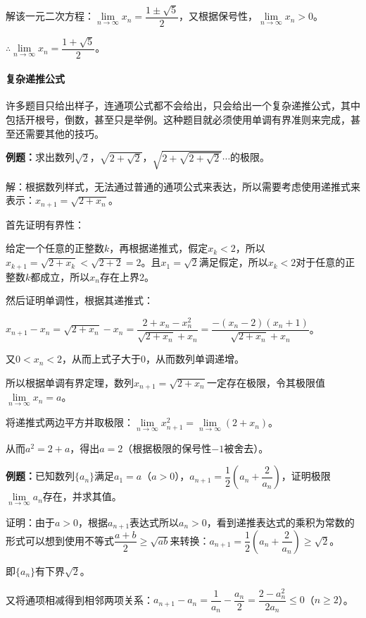 \documentclass[UTF8, 12pt]{ctexart}
\begin{document}
解该一元二次方程：$\lim\limits_{n\to\infty}x_n=\dfrac{1\pm\sqrt{5}}{2}$，又根据保号性，$\lim\limits_{n\to\infty}x_n>0$。

$\therefore\lim\limits_{n\to\infty}x_n=\dfrac{1+\sqrt{5}}{2}$。

\paragraph{复杂递推公式} \leavevmode \medskip

许多题目只给出样子，连通项公式都不会给出，只会给出一个复杂递推公式，其中包括开根号，倒数，甚至只是举例。这种题目就必须使用单调有界准则来完成，甚至还需要其他的技巧。\medskip

\textbf{例题：}求出数列$\sqrt{2}$，$\sqrt{2+\sqrt{2}}$，$\sqrt{2+\sqrt{2+\sqrt{2}}}$$\cdots$的极限。

解：根据数列样式，无法通过普通的通项公式来表达，所以需要考虑使用递推式来表示：$x_{n+1}=\sqrt{2+x_n}$。

首先证明有界性：

给定一个任意的正整数$k$，再根据递推式，假定$x_k<2$，所以$x_{k+1}=\sqrt{2+x_k}<\sqrt{2+2}=2$。且$x_1=\sqrt{2}$满足假定，所以$x_k<2$对于任意的正整数$k$都成立，所以$x_n$存在上界2。

然后证明单调性，根据其递推式：

$x_{n+1}-x_n=\sqrt{2+x_n}-x_n=\dfrac{2+x_n-x_n^2}{\sqrt{2+x_n}+x_n}=\dfrac{-(x_n-2)(x_n+1)}{\sqrt{2+x_n}+x_n}$。\medskip

又$0<x_n<2$，从而上式子大于0，从而数列单调递增。

所以根据单调有界定理，数列$x_{n+1}=\sqrt{2+x_n}$一定存在极限，令其极限值$\lim\limits_{n\to\infty}x_n=a$。

将递推式两边平方并取极限：$\lim\limits_{n\to\infty}x^2_{n+1}=\lim\limits_{n\to\infty}(2+x_n)$。

从而$a^2=2+a$，得出$a=2$（根据极限的保号性$-1$被舍去）。

\textbf{例题：}已知数列$\{a_n\}$满足$a_1=a$（$a>0$），$a_{n+1}=\dfrac{1}{2}\left(a_n+\dfrac{2}{a_n}\right)$，证明极限$\lim\limits_{n\to\infty}a_n$存在，并求其值。

证明：由于$a>0$，根据$a_{n+1}$表达式所以$a_n>0$，看到递推表达式的乘积为常数的形式可以想到使用不等式$\dfrac{a+b}{2}\geqslant\sqrt{ab}$来转换：$a_{n+1}=\dfrac{1}{2}\left(a_n+\dfrac{2}{a_n}\right)\geqslant\sqrt{2}$。

即$\{a_n\}$有下界$\sqrt{2}$。

又将通项相减得到相邻两项关系：$a_{n+1}-a_n=\dfrac{1}{a_n}-\dfrac{a_n}{2}=\dfrac{2-a_n^2}{2a_n}\leqslant0$（$n\geqslant2$）。
\end{document}

